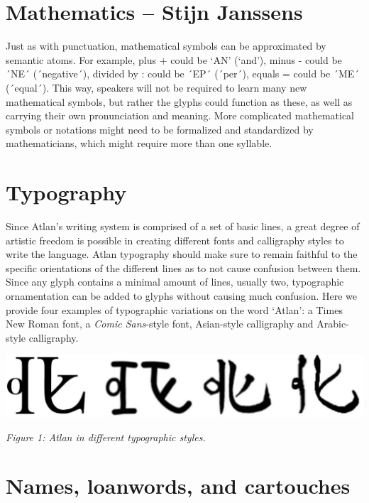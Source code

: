  

\section{Mathematics -- {\small Stijn Janssens}}

Just as with punctuation, mathematical symbols can be approximated by semantic atoms. For example, plus + could be ‘AN’ \an (‘and’), minus - could be ´NE´ \ne (´negative´), divided by : could be ´EP´ \raisebox{-0.5em}{\ep} (´per´), equals = could be ´ME´ \raisebox{-0.3em}{\me} (´equal´). This way, speakers will not be required to learn many new mathematical symbols, but rather the glyphs could function as these, as well as carrying their own pronunciation and meaning. More complicated mathematical symbols or notations might need to be formalized and standardized by mathematicians, which might require more than one syllable. 




\section{Typography}



\noindent Since Atlan’s writing system is comprised of a set of basic lines, a great degree of artistic freedom is possible in creating different fonts and calligraphy styles to write the language. Atlan typography should make sure to remain faithful to the specific orientations of the different lines as to not cause confusion between them. Since any glyph contains a minimal amount of lines, usually two, typographic ornamentation can be added to glyphs without causing much confusion. Here we provide four examples of typographic variations on the word ‘Atlan’: a Times New Roman font, a {\it Comic Sans}-style font, Asian-style calligraphy and Arabic-style calligraphy.


\begin{center}
\includegraphics[scale=0.15]{./Images/Atlogos.jpeg}

{\footnotesize \it Figure 1: Atlan in different typographic styles.}
\end{center}
\section{Names, loanwords, and cartouches}

